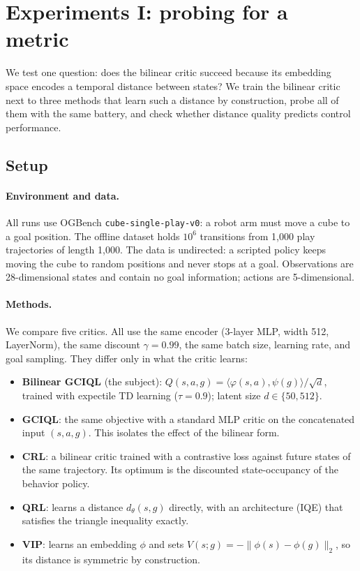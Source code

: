 
\section{Experiments I: probing for a metric}\label{sec:experiments}

We test one question: does the bilinear critic succeed because its embedding space encodes
a temporal distance between states? We train the bilinear critic next to three methods that
learn such a distance by construction, probe all of them with the same battery, and check
whether distance quality predicts control performance.

\subsection{Setup}

\paragraph{Environment and data.}
All runs use OGBench \texttt{cube-single-play-v0}: a robot arm must move a cube to a goal
position. The offline dataset holds $10^6$ transitions from 1{,}000 play trajectories of
length 1{,}000. The data is undirected: a scripted policy keeps moving the cube to random
positions and never stops at a goal. Observations are 28-dimensional states and contain no
goal information; actions are 5-dimensional.

\paragraph{Methods.}
We compare five critics. All use the same encoder (3-layer MLP, width 512, LayerNorm), the
same discount $\gamma=0.99$, the same batch size, learning rate, and goal sampling. They
differ only in what the critic learns:
\begin{itemize}
\item \textbf{Bilinear GCIQL} (the subject): $Q(s,a,g)=\langle\varphi(s,a),\psi(g)\rangle/\sqrt d$,
trained with expectile TD learning ($\tau=0.9$); latent size $d\in\{50,512\}$.
\item \textbf{GCIQL}: the same objective with a standard MLP critic on the concatenated
input $(s,a,g)$. This isolates the effect of the bilinear form.
\item \textbf{CRL}: a bilinear critic trained with a contrastive loss against future states
of the same trajectory. Its optimum is the discounted state-occupancy of the behavior
policy.
\item \textbf{QRL}: learns a distance $d_\theta(s,g)$ directly, with an architecture (IQE)
that satisfies the triangle inequality exactly.
\item \textbf{VIP}: learns an embedding $\phi$ and sets $V(s;g)=-\|\phi(s)-\phi(g)\|_2$, so
its distance is symmetric by construction.
\end{itemize}

